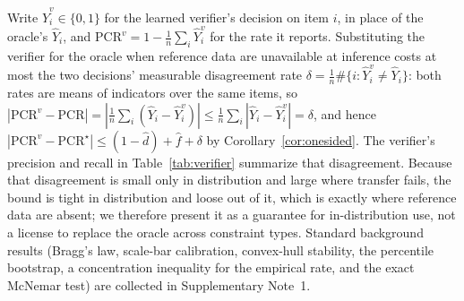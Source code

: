 \documentclass[pdflatex,sn-nature]{sn-jnl}
\begin{document}
\noindent Write $\hat Y^v_i\in\{0,1\}$ for the learned verifier's decision on item $i$, in
place of the oracle's $\hat Y_i$, and $\mathrm{PCR}^v=1-\frac1n\sum_i\hat Y^v_i$ for the rate
it reports. Substituting the verifier for the oracle when reference data are unavailable at
inference costs at most the two decisions' measurable disagreement rate
$\delta=\frac1n\#\{i:\hat Y^v_i\neq\hat Y_i\}$: both rates are means of indicators over the
same items, so $|\mathrm{PCR}^v-\mathrm{PCR}|=|\frac1n\sum_i(\hat Y_i-\hat Y^v_i)|
\le\frac1n\sum_i|\hat Y_i-\hat Y^v_i|=\delta$, and hence
$|\mathrm{PCR}^v-\mathrm{PCR}^\star|\le(1-\hat d)+\hat f+\delta$ by
Corollary~\ref{cor:onesided}. The verifier's precision and recall in
Table~\ref{tab:verifier} summarize that disagreement. Because that disagreement is
small only in distribution and large where transfer fails, the bound is tight in
distribution and loose out of it, which is exactly where reference data are absent; we
therefore present it as a guarantee for in-distribution use, not a license to replace the
oracle across constraint types. Standard background results
(Bragg's law, scale-bar calibration, convex-hull stability, the percentile bootstrap, a
concentration inequality for the empirical rate, and the exact McNemar test) are
collected in Supplementary Note~1.
\end{document}
